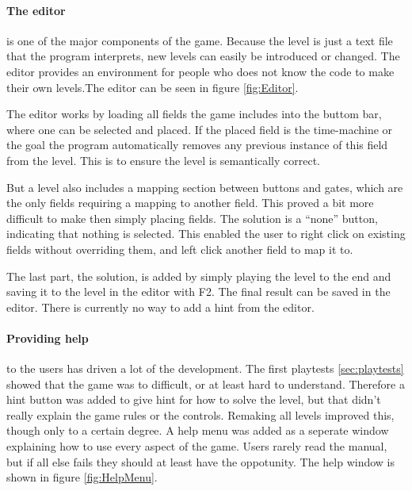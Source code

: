 \paragraph{The editor} is one of the major components of the game.
Because the level is just a text file that the program interprets, new
levels can easily be introduced or changed. The editor provides an
environment for people who does not know the code to make their own
levels.The editor can be seen in figure \ref{fig:Editor}.

The editor works by loading all fields the game includes into the
buttom bar, where one can be selected and placed. If the placed field
is the time-machine or the goal the program automatically removes any
previous instance of this field from the level.  This is to ensure the
level is semantically correct.

But a level also includes a mapping section between buttons and gates,
which are the only fields requiring a mapping to another field. This
proved a bit more difficult to make then simply placing fields. The
solution is a ``none'' button, indicating that nothing is
selected. This enabled the user to right click on existing fields
without overriding them, and left click another field to map it to.

The last part, the solution, is added by simply playing the level to the end
and saving it to the level in the editor with F2. The final result can be saved
in the editor. There is currently no way to add a hint from the editor.

\paragraph{Providing help} to the users has driven a lot of the development.
The first playtests \ref{sec:playtests} showed that the game was to difficult,
or at least hard to understand. Therefore a hint button was added to give
hint for how to solve the level, but that didn't really explain the game
rules or the controls. Remaking all levels improved this, though only to a
certain degree. A help menu was added as a seperate window explaining
how to use every aspect of the game. Users rarely read the manual, but if
all else fails they should at least have the oppotunity. The help window is
shown in figure \ref{fig:HelpMenu}.


